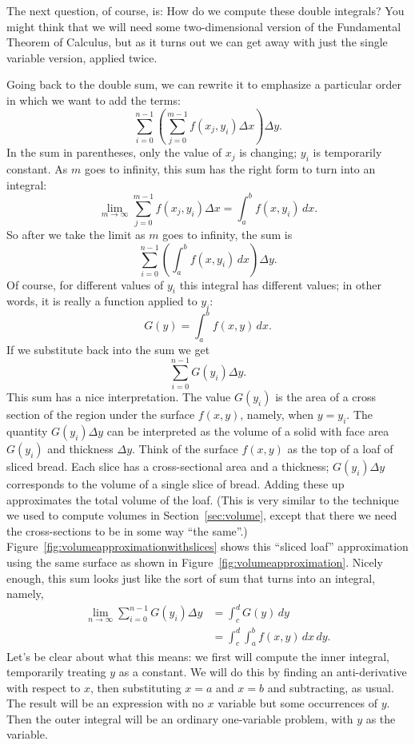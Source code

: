 The next question, of course, is: How do we compute these double
integrals? You might think that we will need some two-dimensional
version of the Fundamental Theorem of Calculus, but as it turns out we
can get away with just the single variable version, applied twice.

Going back to the double sum, we can rewrite it to emphasize a
particular order in which we want to add the terms:
\[\sum_{i=0}^{n-1}\left(\sum_{j=0}^{m-1}f(x_j,y_i)\Delta x\right)\Delta y.\]
In the sum in parentheses, only the value of $x_j$ is changing; $y_i$
is temporarily constant. As $m$  goes to infinity, this sum has the
right form to turn into an integral:
\[\lim_{m\to\infty}\sum_{j=0}^{m-1}f(x_j,y_i)\Delta
  x = \int_a^b f(x,y_i)\,dx.\]
So after we take the limit as $m$ goes to infinity, the sum is
\[\sum_{i=0}^{n-1}\left(\int_a^b f(x,y_i)\,dx\right)\Delta y.\]
Of course, for different values of $y_i$ this integral has different
values; in other words, it is really a function applied to $y_i$:
\[G(y)=\int_a^b f(x,y)\,dx.\]
If we substitute back into the sum we get
\[\sum_{i=0}^{n-1} G(y_i)\Delta y.\]
This sum has a nice interpretation. The value $G(y_i)$ is the area of
a cross section of the region under the surface $f(x,y)$, namely, when
$y=y_i$. The quantity $G(y_i)\Delta y$ can be interpreted as the
volume of a solid with face area $G(y_i)$ and thickness $\Delta y$.
Think of the surface $f(x,y)$ as the top of a loaf of sliced
bread. Each slice has a cross-sectional area and a thickness;
$G(y_i)\Delta y$ corresponds to the volume of a single slice of
bread. Adding these up approximates the total volume of the loaf. (This is
very similar to the technique we used to compute volumes in
Section~\ref{sec:volume}, 
except that there we need the cross-sections to be in
some way ``the same''.) Figure~\ref{fig:volumeapproximationwithslices} 
shows this ``sliced loaf''
approximation using the same surface as shown in 
Figure~\ref{fig:volumeapproximation}.
Nicely enough, this sum looks just like the sort of sum that turns into an
integral, namely,
\begin{align*}
\lim_{n\to\infty}\sum_{i=0}^{n-1} G(y_i)\Delta y&=\int_c^d G(y)\,dy	\\
&=\int_c^d \int_a^b f(x,y)\,dx\,dy.
\end{align*}
Let's be clear about what this means: we first will compute the inner
integral, temporarily treating $y$ as a constant. We will do this by
finding an anti-derivative with respect to $x$, then substituting
$x=a$ and $x=b$ and subtracting, as usual. The result will be an
expression with no $x$ variable but some occurrences of $y$. Then the
outer integral will be an ordinary one-variable problem, with $y$ as
the variable.

